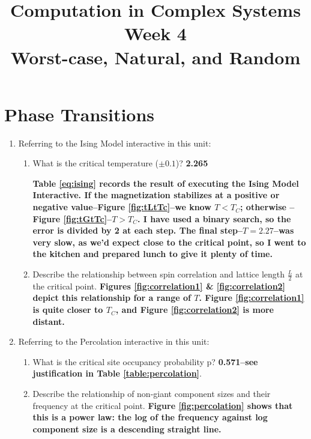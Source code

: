 \documentclass[]{article}
\title{Computation in Complex Systems\\
	Week 4\\Worst-case, Natural, and Random
	}
\begin{document}
\maketitle

\section{Phase Transitions}

\begin{enumerate}
	\item Referring to the Ising Model interactive in this unit:
	\begin{enumerate}
		\item What is the critical temperature ($\pm0.1$)? \textbf{2.265}
		
		\textbf{Table \ref{eq:ising} records the result of executing the Ising Model Interactive. If the magnetization stabilizes at a positive or negative value--Figure \ref{fig:tLtTc}--we know $T<T_C$; otherwise --Figure \ref{fig:tGtTc}--$T>T_C$. I have used a binary search, so the error is divided by 2 at each step. The final step--$T=2.27$--was very slow, as we'd expect close to the critical point, so I went to the kitchen and prepared lunch to give it plenty of time.}
		\item  Describe the relationship between spin correlation and lattice length $\frac{L}{2}$ at the critical point. \textbf{Figures \ref{fig:correlation1} \& \ref{fig:correlation2} depict this relationship for a range of $T$. Figure \ref{fig:correlation1} is quite closer to $T_C$, and Figure \ref{fig:correlation2} is more distant.}
	\end{enumerate}
	
	\item 	Referring to the Percolation interactive in this unit:
	\begin{enumerate}
		\item What is the critical site occupancy probability p?\textbf{ 0.571--see justification in Table \ref{table:percolation}}.
		
		\item Describe the relationship of non-giant component sizes and their frequency at the critical point. \textbf{Figure \ref{fig:percolation} shows that this is a power law: the log of the frequency against log component size is a descending straight line. }
	\end{enumerate}
\end{enumerate}
\end{document}
